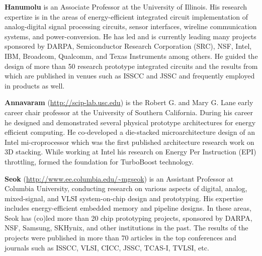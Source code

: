 \vspace{3pt}
\noindent
\textbf{Hanumolu} is an Associate Professor at the University of Illinois. 
His research expertize is in the areas of energy-efficient integrated circuit implementation of analog-digital signal processing circuits, sensor interfaces, wireline communication systems, and power-conversion. 
He has led and is currently leading many projects sponsored by DARPA, Semiconductor Research Corporation (SRC), NSF, Intel, IBM, Broadcom, Qualcomm, and Texas Instruments among others. 
He guided the design of more than 50 research prototype integrated circuits and the results from which are published in venues such as ISSCC and JSSC and frequently employed in products as well.   

\vspace{3pt}
\noindent
\textbf{Annavaram} (\url{http://scip-lab.usc.edu}) is the Robert G. and Mary G. Lane early career chair professor at the University of Southern California. 
During his career he designed and demonstrated several physical prototype architectures for energy efficient computing. 
He co-developed a die-stacked microarchitecture design of an Intel mi-croprocessor which was the first published architecture research work on 3D stacking. 
While working at Intel his research on Energy Per Instruction (EPI) throttling, formed the foundation for TurboBoost technology.

\vspace{3pt}
\noindent
\textbf{Seok} (\url{http://www.ee.columbia.edu/~mgseok}) is an Assistant Professor at Columbia University, conducting research on various aspects of digital, analog, mixed-signal, and VLSI system-on-chip design and prototyping. 
His expertise includes energy-efficient embedded memory and pipeline designs. 
In these areas, Seok has (co)led more than 20 chip prototyping projects, sponsored by DARPA, NSF, Samsung, SKHynix, and other institutions in the past. 
The results of the projects were published in more than 70 articles in the top conferences and journals such as ISSCC, VLSI, CICC, JSSC, TCAS-I, TVLSI, etc.
